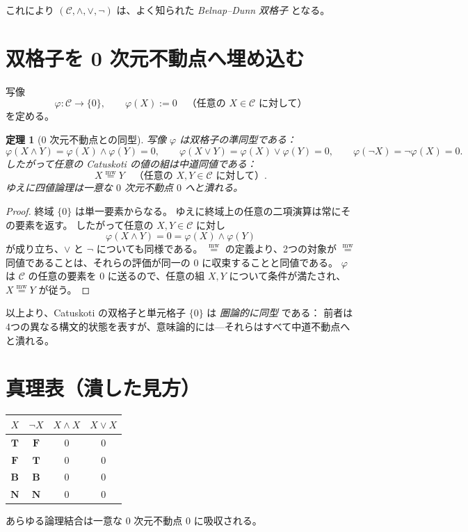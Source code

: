 \documentclass[12pt,a4paper]{article}
\newcommand{\dfix}{\mathfrak{0}}          %
\newcommand{\mw}{\mathrel{\overset{\mathrm{mw}}{=}}} %
\newcommand{\phiMap}{\varphi}            %
\newtheorem{theorem}{定理}[section]
\begin{document}
これにより $(\mathcal{C},\wedge,\vee,\neg)$ は、よく知られた \emph{Belnap–Dunn 双格子} となる。

\section{双格子を 0 次元不動点へ埋め込む}

写像
\begin{equation}
\phiMap:\mathcal{C}\longrightarrow\{\dfix\},
\qquad
\phiMap(X):=\dfix\quad\text{（任意の }X\in\mathcal{C}\text{ に対して）}
\tag{1}
\end{equation}
を定める。

\begin{theorem}[$0$ 次元不動点との同型]
写像 $\phiMap$ は双格子の準同型である：
$$
\phiMap(X\wedge Y)=\phiMap(X)\wedge\phiMap(Y)=\dfix,
\qquad
\phiMap(X\vee Y)=\phiMap(X)\vee\phiMap(Y)=\dfix,
\qquad
\phiMap(\neg X)=\neg\phiMap(X)=\dfix.
$$
したがって任意の Catuskoti の値の組は中道同値である：
$$
X\mw Y\quad\text{（任意の }X,Y\in\mathcal{C}\text{ に対して）}.
$$
ゆえに四値論理は一意な $0$ 次元不動点 $\dfix$ へと潰れる。
\end{theorem}
\begin{proof}
終域 $\{\dfix\}$ は単一要素からなる。
ゆえに終域上の任意の二項演算は常にその要素を返す。
したがって任意の $X,Y\in\mathcal{C}$ に対し
$$
\phiMap(X\wedge Y)=\dfix=\phiMap(X)\wedge\phiMap(Y)
$$
が成り立ち、$\vee$ と $\neg$ についても同様である。
$\mw$ の定義より、2つの対象が $\mw$ 同値であることは、それらの評価が同一の $\dfix$ に収束することと同値である。
$\phiMap$ は $\mathcal{C}$ の任意の要素を $\dfix$ に送るので、任意の組 $X,Y$ について条件が満たされ、$X\mw Y$ が従う。
\end{proof}

以上より、Catuskoti の双格子と単元格子 $\{\dfix\}$ は \emph{圏論的に同型} である：
前者は4つの異なる構文的状態を表すが、意味論的には—それらはすべて中道不動点へと潰れる。

\section{真理表（潰した見方）}

\begin{center}
\begin{tabular}{c|c|c|c}
$X$ & $\neg X$ & $X\wedge X$ & $X\vee X$ \\ \hline
$\mathbf{T}$ & $\mathbf{F}$ & $\dfix$ & $\dfix$ \\
$\mathbf{F}$ & $\mathbf{T}$ & $\dfix$ & $\dfix$ \\
$\mathbf{B}$ & $\mathbf{B}$ & $\dfix$ & $\dfix$ \\
$\mathbf{N}$ & $\mathbf{N}$ & $\dfix$ & $\dfix$
\end{tabular}
\end{center}
あらゆる論理結合は一意な $0$ 次元不動点 $\dfix$ に吸収される。
\end{document}
